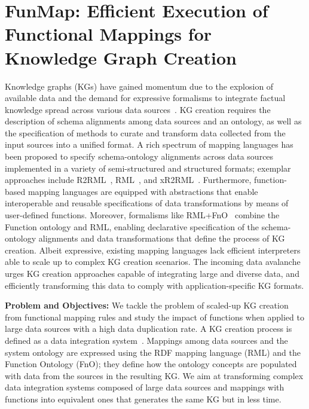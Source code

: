 
\section{FunMap: Efficient Execution of Functional Mappings for Knowledge Graph Creation}

Knowledge graphs (KGs) have gained momentum due to the explosion of available data and the demand for expressive formalisms to integrate factual knowledge spread across various data sources~\cite{abs-2003-02320}.
KG creation requires the description of schema alignments among data sources and an ontology, as well as the specification of methods to curate and transform data collected from the input sources into a unified format. A rich spectrum of mapping languages has been proposed to specify schema-ontology alignments across data sources implemented in a variety of semi-structured and structured formats; exemplar approaches include R2RML~\cite{R2RML}, RML~\cite{dimou2014rml}, and xR2RML~\cite{michel2015translation}. Furthermore, function-based mapping languages \cite{de2017declarative,debruyne2016r2rml,junior2016funul,vu2019d} are equipped with abstractions that enable interoperable and reusable specifications of data transformations by means of user-defined functions. Moreover, formalisms like RML+FnO~\cite{de2017declarative} combine the Function ontology and RML, enabling declarative specification of the schema-ontology alignments and data transformations that define the process of KG creation. Albeit expressive, existing mapping languages lack efficient interpreters able to scale up to complex KG creation scenarios. The incoming data avalanche urges KG creation approaches capable of integrating large and diverse data, and efficiently transforming this data to comply with application-specific KG formats.   

\noindent \textbf{Problem and Objectives:} We tackle the problem of scaled-up KG creation from functional mapping rules and study the impact of functions when applied to large data sources with a high data duplication rate. A KG creation process is defined as a data integration system~\cite{Lenzerini02}. Mappings among data sources and the system ontology are expressed using the RDF mapping language (RML) \cite{de2017declarative} and the Function Ontology (FnO); they define how the ontology concepts are populated with data from the sources in the resulting KG. We aim at transforming complex data integration systems composed of large data sources and mappings with functions into equivalent ones that generates the same KG but in less time.

